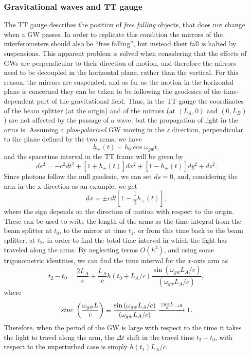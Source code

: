 \subsubsection{Gravitational waves and TT gauge}
The TT gauge describes the position of \textit{free falling} objects, that does not change when a GW passes. 
In order to replicate this condition the mirrors of the interferometers should also be ``free falling'', but instead their fall is halted by suspensions.
This apparent problem is solved when considering that the effects of GWs are perpendicular to their direction of motion, and therefore the mirrors need to be decoupled in the horizontal plane, rather than the vertical.
For this reason, the mirrors are suspended, and as far as the motion in the horizontal plane is concerned they can be taken to be following the geodesics of the time-dependent part of the gravitational field.
Thus, in the TT gauge the coordinates of the beam splitter (at the origin) and of the mirrors (at $(L_A,0)$ and $(0,L_B)$) are not affected by the passage of a wave, but the propagation of light in the arms is.
Assuming a \textit{plus-polarized} GW moving in the $z$ direction, perpendicular to the plane defined by the two arms, we have 
\[
    h_+(t)=h_0\cos{\omega_{gw}t},
\]
and the spacetime interval in the TT frame will be given by
\[
    ds^2= -c^2dt^2 + [1+h_+ (t)]dx^2 + [1- h_+(t)]dy^2 + dz^2.
\]
Since photons follow the null geodesic, we can set $ds=0$, and, considering the arm in the x direction as an example, we get 
\[
    dx = \pm cdt\left[1-\frac{1}{2}h_+(t)\right], 
\]
where the sign depends on the direction of motion with respect to the origin. 
These can be used to write the length of the arms as the time integral from the beam splitter at $t_0$, to the mirror at time $t_1$, or from this time back to the beam splitter, at $t_2$, in order to find the total time interval in which the light has traveled along the arms.
By neglecting terms $O(h^2)$, and using some trigonometric identities, we can find the time interval for the $x$-axis arm as 
\begin{equation}
    t_2-t_0 = \frac{2L_A}{c} + \frac{L_A}{c}h(t_0+L_A/c)\frac{\sin{(\omega_{gw}L_A/c)}}{(\omega_{gw}L_A/c)},
    \label{eq: time interval for x-axis}
\end{equation}
where 
\[
    sinc\hspace{1mm}\left(\frac{\omega_{gw}L}{c}\right) \equiv \frac{\sin{(\omega_{gw}L_A/c)}}{(\omega_{gw}L_A/c)}\xrightarrow{\frac{\omega_{gw}L}{c}\to0}1.
\]
Therefore, when the period of the GW is large with respect to the time it takes the light to travel along the arm, the $\Delta t$ shift in the travel time $t_2 - t_0$, with respect to the unperturbed case is simply $h(t_1)L_A/c$.
